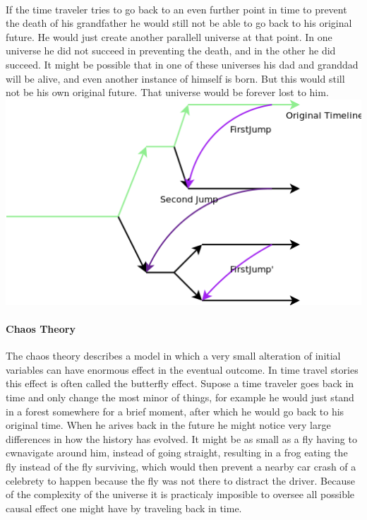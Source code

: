 \paragraph{}
If the time traveler tries to go back to an even further point in time to prevent the death of his grandfather he would still not be able to go back to his original future. He would just create another parallell universe at that point. In one universe he did not succeed in preventing the death, and in the other he did succeed. It might be possible that in one of these universes his dad and granddad will be alive, and even another instance of himself is born. But this would still not be his own original future. That universe would be forever lost to him.
\\
\includegraphics[scale=0.5]{./images/fixingit.png}

\paragraph{Chaos Theory}
The chaos theory describes a model in which a very small alteration of initial variables can have enormous effect in the eventual outcome. In time travel stories this effect is often called the butterfly effect. Supose a time traveler goes back in time and only change the most minor of things, for example he would just stand in a forest somewhere for a brief moment, after which he would go back to his original time. When he arives back in the future he might notice very large differences in how the history has evolved. It might be as small as a fly having to cwnavigate around him, instead of going straight, resulting in a frog eating the fly instead of the fly surviving, which would then prevent a nearby car crash of a celebrety to happen because the fly was not there to distract the driver.
Because of the complexity of the universe it is practicaly imposible to oversee all possible causal effect one might have by traveling back in time.
